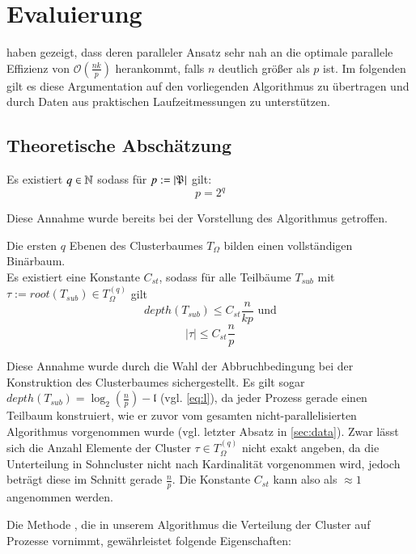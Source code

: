 \chapter{Evaluierung}
\label{chp:Evaluation}
  \citet{distrh2} haben gezeigt, dass deren paralleler Ansatz sehr nah an die optimale parallele Effizienz von $\mathcal{O}(\frac{nk}{p})$ herankommt, falls $n$ deutlich größer als $p$ ist.
  Im folgenden gilt es diese Argumentation auf den vorliegenden Algorithmus zu übertragen und durch Daten aus praktischen Laufzeitmessungen zu unterstützen.
  
  \section{Theoretische Abschätzung}
  
  \begin{ann}
  \label{ann:nodes}
    Es existiert $q \in \mathbb{N}$ sodass für $p := \left| \mathfrak{P} \right|$ gilt:
    \[ p = 2^q \]
  \end{ann}
  Diese Annahme wurde bereits bei der Vorstellung des Algorithmus getroffen.
  
  \begin{ann}
  \label{ann:tree}
    Die ersten $q$ Ebenen des Clusterbaumes $T_\Omega$ bilden einen vollständigen Binärbaum.\\
    Es existiert eine Konstante $C_{st}$, sodass für alle Teilbäume $T_{sub}$ mit $\tau := root(T_{sub}) \in T_\Omega^{(q)}$ gilt
    \[
     depth(T_{sub}) \leq C_{st} \frac{n}{kp} \text{ und}
    \]
    \[
     |\tau| \leq C_{st}\frac{n}{p}
    \]
  \end{ann}
  Diese Annahme wurde durch die Wahl der Abbruchbedingung bei der Konstruktion des Clusterbaumes sichergestellt. Es gilt sogar $depth(T_{sub}) = \log_2(\frac{n}{p}) - \mathfrak{l}$ (vgl. \autoref{eq:l}),
  da jeder Prozess gerade einen Teilbaum konstruiert, wie er zuvor vom gesamten nicht-parallelisierten Algorithmus vorgenommen wurde (vgl. letzter Absatz in \autoref{sec:data}). Zwar lässt sich die
  Anzahl Elemente der Cluster $\tau \in T_\Omega^{(q)}$ nicht exakt angeben, da die Unterteilung in Sohncluster nicht nach Kardinalität vorgenommen wird, jedoch beträgt diese im Schnitt gerade 
  $\frac{n}{p}$. Die Konstante $C_{st}$ kann also als $\approx 1$ angenommen werden.
  
  Die Methode , die in unserem Algorithmus die Verteilung der Cluster auf Prozesse vornimmt, gewährleistet folgende Eigenschaften:
  

